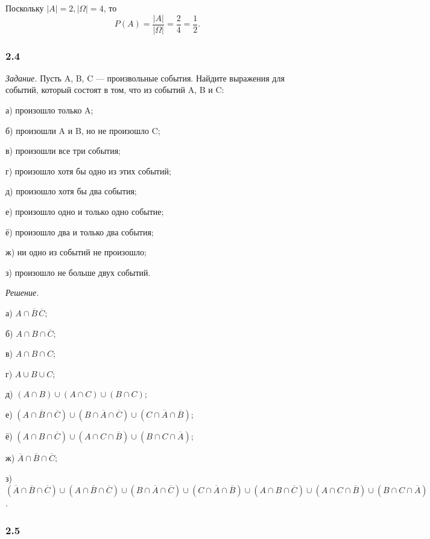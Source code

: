 \documentclass{book}
\begin{document}
Поскольку $|A|=2, |\Omega|=4$, то $$P(A)=\frac{|A|}{|\Omega|}=\frac{2}{4}=\frac{1}{2}.$$

\subsubsection*{2.4}

\textit{Задание.} Пусть A, B, C --- произвольные события. Найдите выражения для событий, который состоят в том, что из событий A, B и C:

а) произошло только  A;

б) произошли A и B, но не произошло C;

в) произошли все три события;

г) произошло хотя бы одно из этих событий;

д) произошло хотя бы два события;

е) произошло одно и только одно событие;

ё) произошло два и только два события;

ж) ни одно из событий не произошло;

з) произошло не больше двух событий.

\textit{Решение.}

а) $A\cap\overline{B}\,\overline{C}$;

б) $A\cap B\cap\overline{C}$;

в) $A\cap B\cap C$;

г) $A\cup B\cup C$;

д) $\left(A\cap B\right)\cup\left(A\cap C\right)\cup\left(B\cap C\right)$;

е) $\left(A\cap\overline{B}\cap\overline{C}\right)\cup\left(B\cap\overline{A}\cap\overline{C}\right)\cup\left(C\cap\overline{A}\cap\overline{B}\right)$;

ё) $\left(A\cap B\cap\overline{C}\right)\cup\left(A\cap C\cap\overline{B}\right)\cup\left(B\cap C\cap\overline{A}\right)$;

ж) $\overline{A}\cap\overline{B}\cap\overline{C}$;

з) $\left(\overline{A}\cap\overline{B}\cap\overline{C}\right)\cup\left(A\cap\overline{B}\cap\overline{C}\right)\cup\left(B\cap\overline{A}\cap\overline{C}\right)\cup\left(C\cap\overline{A}\cap\overline{B}\right)\cup\left(A\cap B\cap\overline{C}\right)\cup\left(A\cap C\cap\overline{B}\right)\cup\left(B\cap C\cap\overline{A}\right)$.

\subsubsection*{2.5}
\end{document}
